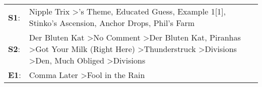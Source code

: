 \begin{supertabular}{p{0.03\textwidth}p{0.92\textwidth}}
 \textbf{S1}:  &                                                                                                                                                                                               Nipple Trix\textsuperscript{} \textgreater {}'s Theme\textsuperscript{}, \enspace Educated Guess\textsuperscript{}, \enspace Example 1[1]\textsuperscript{}, \enspace Stinko's Ascension\textsuperscript{}, \enspace Anchor Drops\textsuperscript{}, \enspace Phil's Farm\textsuperscript{}  \enspace  \\
 \textbf{S2}:  &  Der Bluten Kat\textsuperscript{} \textgreater \enspace No Comment\textsuperscript{} \textgreater \enspace Der Bluten Kat\textsuperscript{}, \enspace Piranhas\textsuperscript{} \textgreater \enspace Got Your Milk (Right Here)\textsuperscript{} \textgreater \enspace Thunderstruck\textsuperscript{} \textgreater \enspace Divisions\textsuperscript{} \textgreater \enspace Den\textsuperscript{}, \enspace Much Obliged\textsuperscript{} \textgreater \enspace Divisions\textsuperscript{}  \enspace  \\
 \textbf{E1}:  &                                                                                                                                                                                                                                                                                                                                                                                                             Comma Later\textsuperscript{} \textgreater \enspace Fool in the Rain\textsuperscript{}  \enspace  \\
\end{supertabular}
